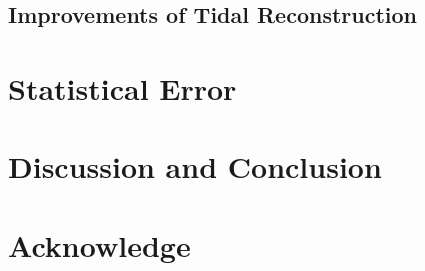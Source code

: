 \documentclass[aps,prd,twocolumn,showpacs,superscriptaddress,groupedaddress,nofootinbib]{revtex4}  %
\begin{document}
\subsection{Improvements of Tidal Reconstruction}
\section{Statistical Error}

%
\section{Discussion and Conclusion}

\section{Acknowledge}



\end{document}
